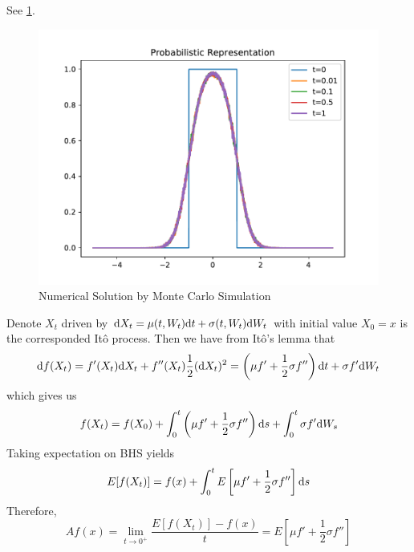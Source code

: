 \documentclass{homework}
\begin{document}
\begin{subproblem}
        \item
        See \cref{fig:prob sol}.
        \begin{figure}[h]
            \centering
            \includegraphics[width=\textwidth]{prob-sol}
            \caption{Numerical Solution by Monte Carlo Simulation}
            \label{fig:prob sol}
        \end{figure}
    \end{subproblem}

    \problem
    Denote $X_t$ driven by $\mathrm d X_t=\mu(t,W_t)\mathrm d t+\sigma(t,W_t)\mathrm d W_t$
    with initial value $X_0=x$
    is the corresponded It\^o process. Then we have from It\^o's lemma
    that
    \[\mathrm d f(X_t)=f'(X_t)\mathrm d X_t+f''(X_t)\frac{1}{2}(\mathrm d X_t)^2
    =\left(\mu f'+\frac{1}{2}\sigma f''\right)\mathrm d t+\sigma f'\mathrm d W_t\]
    which gives us
    \[f(X_t)=f(X_0)+\int_0^t\left(\mu f'+\frac{1}{2}\sigma f''\right)\mathrm d s
    +\int_0^t\sigma f'\mathrm d W_s\]
    Taking expectation on BHS yields
    \[E[f(X_t)]=f(x)+\int_0^tE\left[\mu f'+\frac{1}{2}\sigma f''\right]\mathrm d s\]
    Therefore,
    \[Af(x)=\lim_{t\to 0^+}\frac{E[f(X_t)]-f(x)}{t}
    =E\left[\mu f'+\frac{1}{2}\sigma f''\right]\]

    \problem
\end{document}
